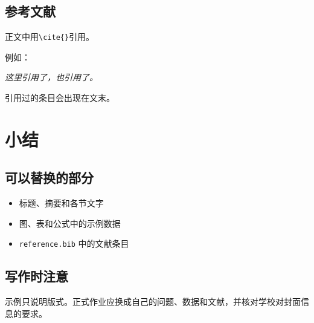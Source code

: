 \documentclass[12pt,hyperref,a4paper,UTF8]{ctexart}
\begin{document}
\subsection{参考文献}
正文中用\verb|\cite{}|引用。

例如：


   \textit{ 这里引用了\cite{0Isaac}，也引用了\cite{2016The}。}


引用过的条目会出现在文末。

\section{小结}
\subsection{可以替换的部分}
\begin{itemize}
    \item 标题、摘要和各节文字
    \item 图、表和公式中的示例数据
    \item \texttt{reference.bib} 中的文献条目
\end{itemize}
\subsection{写作时注意}
示例只说明版式。正式作业应换成自己的问题、数据和文献，并核对学校对封面信息的要求。


\end{document}
